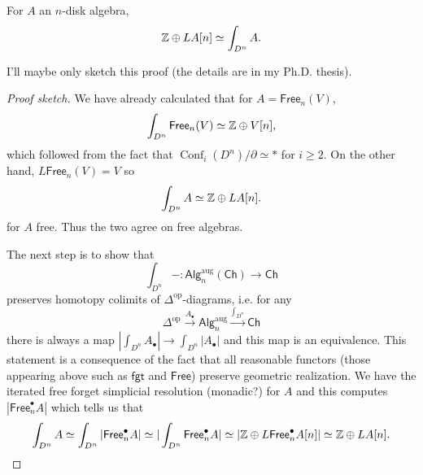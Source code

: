 \documentclass{amsart}
\DeclareMathOperator{\Conf}{Conf}
\begin{document}
\begin{theorem}
    For $A$ an $n$-disk algebra,
    \begin{equation*}
        \mathbb{Z}\oplus LA[n] \simeq \int_{D^n}A.
    \end{equation*}
\end{theorem}
I'll maybe only sketch this proof (the details are in my Ph.D. thesis).
\begin{proof}[Proof sketch]
    We have already calculated that for $A=\mathsf{Free}_n(V)$,
    \begin{equation*}
        \int_{D^n}\mathsf{Free}_n(V) \simeq \mathbb{Z}\oplus V[n],
    \end{equation*}
    which followed from the fact that $\Conf_i(D^n)/\partial\simeq*$ for $i\geq 2$.
    On the other hand, $L\mathsf{Free}_n(V)=V$ so
    \begin{equation*}
        \int_{D^n}A\simeq \mathbb{Z}\oplus LA[n].
    \end{equation*}
    for $A$ free. Thus the two agree on free algebras.

    The next step is to show that
    \begin{equation*}
        \int_{D^n} - :\mathsf{Alg}^\text{aug}_n(\mathsf{Ch})\to\mathsf{Ch}
    \end{equation*}
    preserves homotopy colimits of $\Delta^\text{op}$-diagrams, i.e. for any
    \begin{equation*}
        \Delta^\text{op}\xrightarrow{A_\bullet}\mathsf{Alg}_n^\text{aug}\xrightarrow{\int_{D^n}}\mathsf{Ch}
    \end{equation*}
    there is always a map $|\int_{D^n}A_\bullet|\to \int_{D^n}|A_\bullet|$ and this map
    is an equivalence. This statement is a consequence of the fact that all reasonable
    functors (those appearing above such as $\mathsf{fgt}$ and $\mathsf{Free}$) preserve
    geometric realization. We have the iterated free forget simplicial resolution (monadic?) for $A$
    and this computes $|\mathsf{Free}_n^\bullet A|$ which tells us that
    \begin{equation*}
        \int_{D^n} A\simeq \int_{D^n} |\mathsf{Free}_n^\bullet A|\simeq |\int_{D^n}\mathsf{Free}_n^\bullet A|\simeq |\mathbb{Z}\oplus L\mathsf{Free}_n^\bullet A[n]|\simeq \mathbb{Z}\oplus LA[n].
    \end{equation*}
\end{proof}
\end{document}
